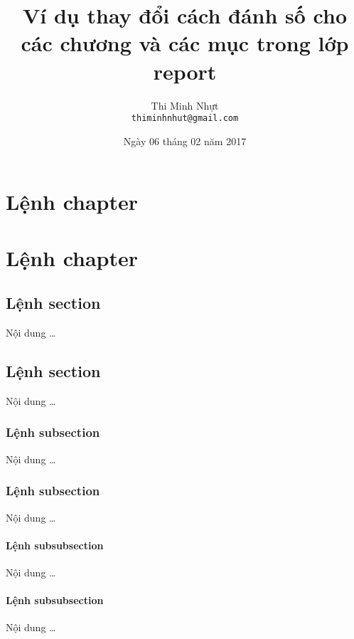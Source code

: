 \documentclass[12pt,a4paper]{report}
\title{\bfseries \huge Ví dụ thay đổi cách đánh số cho các chương và các mục trong lớp report}
\author{\Large Thi Minh Nhựt \bigskip \\  \Large \texttt{thiminhnhut@gmail.com}}
\date{\Large Ngày 06 tháng 02 năm 2017}
\begin{document}
\maketitle
\tableofcontents
\thispagestyle{empty}
\newpage

\chapter{Lệnh chapter}
\chapter{Lệnh chapter}

\section{Lệnh section}
Nội dung \ldots
\section{Lệnh section}
Nội dung \ldots

\subsection{Lệnh subsection}
Nội dung \ldots
\subsection{Lệnh subsection}
Nội dung \ldots

\subsubsection{Lệnh subsubsection}
Nội dung \ldots
\subsubsection{Lệnh subsubsection}
Nội dung \ldots
\end{document}
